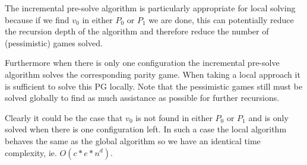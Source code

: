 The incremental pre-solve algorithm is particularly appropriate for local solving because if we find $v_0$ in either $P_0$ or $P_1$ we are done, this can potentially reduce the recursion depth of the algorithm and therefore reduce the number of (pessimistic) games solved.

Furthermore when there is only one configuration the incremental pre-solve algorithm solves the corresponding parity game. When taking a local approach it is sufficient to solve this PG locally. Note that the pessimistic games still must be solved globally to find as much assistance as possible for further recursions.

Clearly it could be the case that $v_0$ is not found in either $P_0$ or $P_1$ and is only solved when there is one configuration left. In such a case the local algorithm behaves the same as the global algorithm so we have an identical time complexity, ie. $O(c*e*n^d)$.